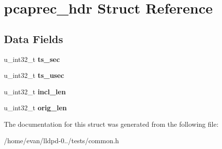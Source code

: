 \section{pcaprec\-\_\-hdr \-Struct \-Reference}
\label{structpcaprec__hdr}
\subsection*{\-Data \-Fields}
\begin{DoxyCompactItemize}
\item 
u\-\_\-int32\-\_\-t {\bfseries ts\-\_\-sec}\label{structpcaprec__hdr_a7e1215812c7f74eb0a1d692f19eeaed7}

\item 
u\-\_\-int32\-\_\-t {\bfseries ts\-\_\-usec}\label{structpcaprec__hdr_ac4bb17b0f55d735b43e6b0c71a34fce3}

\item 
u\-\_\-int32\-\_\-t {\bfseries incl\-\_\-len}\label{structpcaprec__hdr_a92007fd5f6b413f703c87aa0221cf75b}

\item 
u\-\_\-int32\-\_\-t {\bfseries orig\-\_\-len}\label{structpcaprec__hdr_a057ba27ff5bdc31b25ba1801c49a9cc1}

\end{DoxyCompactItemize}


\-The documentation for this struct was generated from the following file\-:\begin{DoxyCompactItemize}
\item 
/home/evan/lldpd-\/0../tests/common.\-h\end{DoxyCompactItemize}
